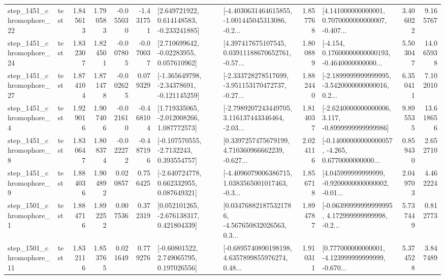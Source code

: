 \begin{tabular}{llrrrrllrlrr}
 step\_1451\_chromophore\_22 &      test &      1.845613 &    1.790583 &     -0.055030 & -1.431751 &    [2.649721922, 0.614148583, -0.233241885] &  [-4.4030631464615855, -1.001445045313086, -0.2... &       1.857768 &  [4.141000000000001, 0.7070000000000007, -0.407... &            3.406022 &          9.165767 \\
 step\_1451\_chromophore\_24 &      test &      1.832307 &    1.824501 &     -0.007805 & -0.070037 &     [2.710699642, -0.02283955, 0.057610962] &  [4.397417675107545, 0.03911188670652761, -0.57... &       1.800889 &  [-4.154, 0.17600000000000193, -0.4640000000000... &            5.503047 &         14.065938 \\
 step\_1451\_chromophore\_27 &      test &      1.874104 &    1.871478 &     -0.002625 &  0.079329 &   [-1.365649798, -2.34378691, -0.121145259] &  [-2.333728278517699, -3.951153170472737, -0.27... &       1.882440 &  [-2.1899999999999995, -3.5420000000000016, 0.2... &            6.350411 &          7.102010 \\
  step\_1451\_chromophore\_4 &      test &      1.929016 &    1.907406 &     -0.021610 & -0.468104 &    [1.719335065, -2.012008266, 1.087772573] &  [-2.7989207243449705, 3.116137443346464, -2.03... &       1.814037 &  [-2.6240000000000006, 3.117, -0.8999999999999986] &            9.895535 &         13.618656 \\
  step\_1451\_chromophore\_8 &      test &      1.830647 &    1.808374 &     -0.022272 & -0.487196 &     [-0.107570555, -2.7132243, 0.393554757] &  [0.3397257475679199, 4.710360966662239, -0.627... &       2.024116 &  [-0.14000000000000057, -4.265, 0.6770000000000... &            0.859430 &          2.652710 \\
  step\_1451\_chromophore\_9 &      test &      1.884036 &    1.904892 &      0.020857 &  0.756425 &    [-2.640724778, 0.662332955, 0.087649321] &  [-4.4096079006386715, 1.0383565001017463, -0.3... &       1.856718 &  [4.045999999999999, -0.9200000000000002, -0.01... &            2.049703 &          4.462224 \\
  step\_1501\_chromophore\_1 &      test &      1.884716 &    1.892252 &      0.007536 &  0.372319 &    [0.052101265, -2.676138317, 0.421804339] &  [0.034768821875321786, -4.567650832026563, 0.3... &       1.894787 &  [-0.06399999999999995, 4.172999999999998, -0.2... &            5.737449 &          0.812773 \\
 step\_1501\_chromophore\_11 &      test &      1.832116 &    1.853765 &      0.021649 &  0.779276 &     [-0.60801522, 2.749065795, 0.197026556] &  [-0.6895740890198198, 4.6357899855976274, 0.48... &       1.910311 &  [0.777000000000001, -4.123999999999999, -0.670... &            5.374528 &          3.847489 \\

\end{tabular}
